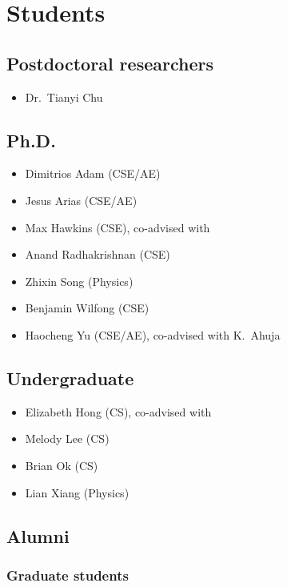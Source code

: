 \section{Students}

\subsection{Postdoctoral researchers}

\begin{itemize}
    \item Dr.\ Tianyi Chu
\end{itemize}

\subsection{Ph.D.}

\begin{itemize}
    \item Dimitrios Adam (CSE/AE)
    \item Jesus Arias (CSE/AE)
    \item Max Hawkins (CSE), co-advised with \Rich
    \item Anand Radhakrishnan (CSE)
    \item Zhixin Song (Physics)
    \item Benjamin Wilfong (CSE)
    \item Haocheng Yu (CSE/AE), co-advised with K.\ Ahuja
\end{itemize}

\subsection{Undergraduate}

\begin{itemize}

    \item Elizabeth Hong (CS), co-advised with \Rich
    \item Melody Lee (CS)
    \item Brian Ok (CS)
    \item Lian Xiang (Physics)
\end{itemize}

\subsection{Alumni}

\subsubsection{Graduate students}

